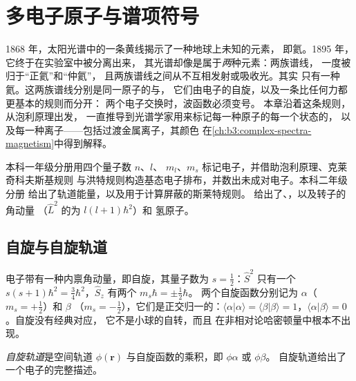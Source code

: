 \chapter{多电子原子与谱项符号}\label{ch:b3:many-electron-atoms}

1868 年，太阳光谱中的一条黄线揭示了一种地球上未知的元素，
即氦。1895 年，它终于在实验室中被分离出来，
其光谱却像是属于\emph{两}种元素：两族谱线，
一度被归于“正氦”和“仲氦”，
且两族谱线之间从不互相发射或吸收光。其实
只有一种氦。这两族谱线分别是同一原子的与，
它们由电子的自旋，以及一条比任何力都更基本的规则而分开：
两个电子交换时，波函数必须变号。
本章沿着这条规则，从泡利原理出发，
一直推导到光谱学家用来标记每一种原子的每一个状态的，
以及每一种离子——包括过渡金属离子，其颜色
在\cref{ch:b3:complex-spectra-magnetism}中得到解释。

\begin{recall}
本科一年级分册用四个量子数 $n$、$l$、
$m_l$、$m_s$ 标记电子，并借助泡利原理、克莱奇科夫斯基规则
与洪特规则构造基态电子排布，并数出未成对电子。本科二年级分册
给出了轨道能量，以及用于计算屏蔽的斯莱特规则。
给出了、，以及转子的角动量
（$\hat L^2$ 的为 $l(l+1)\hbar^2$）和
氢原子。
\end{recall}

\section{自旋与自旋轨道}

电子带有一种内禀角动量，即自旋，其量子数为
$s = \frac12$：$\hat S^2$ 只有一个 $s(s+1)\hbar^2 =
\frac34\hbar^2$，$\hat S_z$ 有两个 $m_s\hbar = \pm\frac12\hbar$。
两个自旋函数分别记为 $\alpha$（$m_s = +\frac12$）和 $\beta$
（$m_s = -\frac12$），它们是正交归一的：$\langle\alpha|\alpha\rangle =
\langle\beta|\beta\rangle = 1$，$\langle\alpha|\beta\rangle = 0$。自旋没有经典对应，
它不是小球的自转，而且
在非相对论哈密顿量中根本不出现。

\begin{definition}[自旋轨道]\label{def:b3:many-electron-atoms:spin-orbital}
\emph{自旋轨道}是空间轨道
$\phi(\mathbf r)$ 与自旋函数的乘积，即 $\phi\alpha$ 或 $\phi\beta$。
自旋轨道给出了一个电子的完整描述。
\end{definition}

